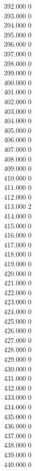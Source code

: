 { 392.000	0 \\
 393.000	0 \\
 394.000	0 \\
 395.000	0 \\
 396.000	0 \\
 397.000	0 \\
 398.000	0 \\
 399.000	0 \\
 400.000	0 \\
 401.000	0 \\
 402.000	0 \\
 403.000	0 \\
 404.000	0 \\
 405.000	0 \\
 406.000	0 \\
 407.000	0 \\
 408.000	0 \\
 409.000	0 \\
 410.000	0 \\
 411.000	0 \\
 412.000	0 \\
 413.000	2 \\
 414.000	0 \\
 415.000	0 \\
 416.000	0 \\
 417.000	0 \\
 418.000	0 \\
 419.000	0 \\
 420.000	0 \\
 421.000	0 \\
 422.000	0 \\
 423.000	0 \\
 424.000	0 \\
 425.000	0 \\
 426.000	0 \\
 427.000	0 \\
 428.000	0 \\
 429.000	0 \\
 430.000	0 \\
 431.000	0 \\
 432.000	0 \\
 433.000	0 \\
 434.000	0 \\
 435.000	0 \\
 436.000	0 \\
 437.000	0 \\
 438.000	0 \\
 439.000	0 \\
 440.000	0 \\
}
